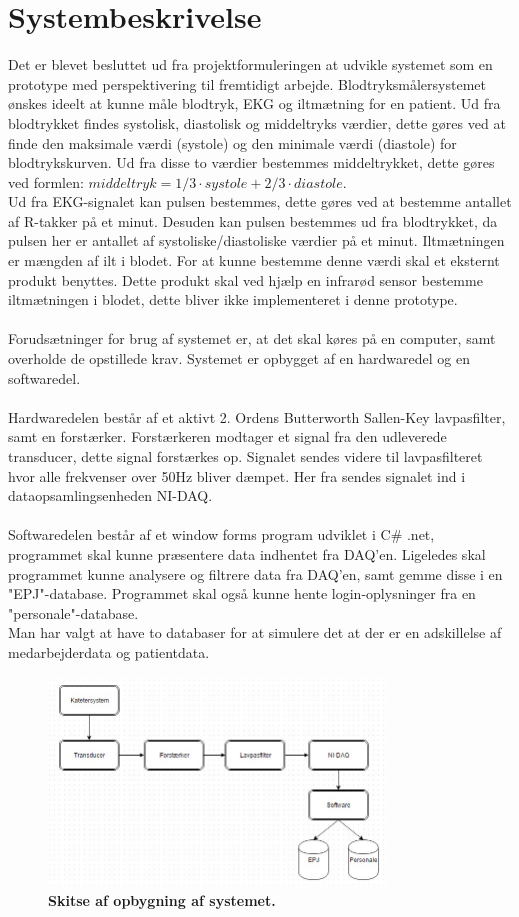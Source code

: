 \section{Systembeskrivelse}
Det er blevet besluttet ud fra projektformuleringen at udvikle systemet som en prototype med perspektivering til fremtidigt arbejde. Blodtryksmålersystemet ønskes ideelt at kunne måle blodtryk, EKG og iltmætning for en patient. Ud fra blodtrykket findes systolisk, diastolisk og middeltryks værdier, dette gøres ved at finde den maksimale værdi (systole) og den minimale værdi (diastole) for blodtrykskurven. Ud fra disse to værdier bestemmes middeltrykket, dette gøres ved formlen: $middeltryk = 1/3 \cdot systole + 2/3 \cdot diastole$. \cite{blodtrykwiki}
\\ Ud fra EKG-signalet kan pulsen bestemmes, dette gøres ved at bestemme antallet af R-takker på et minut. Desuden kan pulsen bestemmes ud fra blodtrykket, da pulsen her er antallet af systoliske/diastoliske værdier på et minut. Iltmætningen er mængden af ilt i blodet. For at kunne bestemme denne værdi skal et eksternt produkt benyttes. Dette produkt skal ved hjælp en infrarød sensor bestemme iltmætningen i blodet, dette bliver ikke implementeret i denne prototype.\\\\
Forudsætninger for brug af systemet er, at det skal køres på en computer, samt overholde de opstillede krav. Systemet er opbygget af en hardwaredel og en softwaredel. \\\\
Hardwaredelen består af et aktivt 2. Ordens Butterworth Sallen-Key lavpasfilter, samt en forstærker. Forstærkeren modtager et signal fra den udleverede transducer, dette signal forstærkes op. Signalet sendes videre til lavpasfilteret hvor alle frekvenser over 50Hz bliver dæmpet. Her fra sendes signalet ind i dataopsamlingsenheden NI-DAQ.\\\\
Softwaredelen består af et window forms program udviklet i C\# .net, programmet skal kunne præsentere data indhentet fra DAQ’en. Ligeledes skal programmet kunne analysere og filtrere data fra DAQ’en, samt gemme disse i en "EPJ"-database. Programmet skal også kunne hente login-oplysninger fra en "personale"-database. \\
Man har valgt at have to databaser for at simulere det at der er en adskillelse af medarbejderdata og patientdata.
\begin{figure}[H]
\includegraphics[width =0.8\textwidth , center]{billeder/system}
\caption{\textbf{Skitse af opbygning af systemet.}}
\end{figure}
